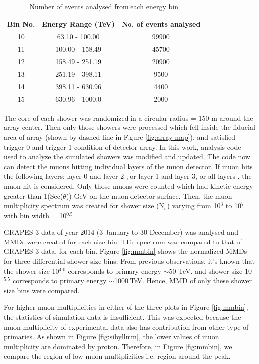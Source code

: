 \documentclass[12pt]{article}
\begin{document}
\begin{table}[h]
\centering
\begin{tabular}{ | c | c | c |} 
\hline
Bin No. & Energy Range (TeV) & No. of events analysed  \\ 
\hline
10 & 63.10 - 100.00 & 99900  \\ 
\hline
11 & 100.00 - 158.49 & 45700  \\
\hline
12 & 158.49 - 251.19 & 20900 \\
\hline
13 & 251.19 - 398.11 & 9500 \\
\hline
14 & 398.11 - 630.96 & 4400 \\
\hline
15 & 630.96 - 1000.0 & 2000 \\
\hline
\end{tabular}
\caption{Number of events analysed from each energy bin}
\label{tab:binning}
\end{table}

The core of each shower was randomized in a circular radius  = 150 m around the array center. Then only those showers were processed which fell inside the fiducial area of array (shown by dashed line in Figure \ref{fig:array-map}), and satisfied trigger-0 and trigger-1 condition of detector array\cite{gupta}. In this work, analysis code used to analyze the simulated showers was modified and updated. The code now can detect the muons hitting individual layers of the muon detector. If muon hits the following layers: layer 0 and layer 2 , or layer 1 and layer 3, or all layers , the muon hit is considered. Only those muons were counted which had kinetic energy greater than 1(Sec($\theta$)) GeV on the muon detector surface. Then, the muon multiplicity spectrum was created for shower size (N$_e$) varying from 10$^3$ to 10$^7$ with bin width = 10$^{0.5}$. 

GRAPES-3 data of year 2014 (3 January to 30 December) was analysed and MMDs were created for each size bin. This spectrum was compared to that of GRAPES-3 data, for each bin. Figure \ref{fig:mmbin} shows the normalized MMDs for three differential shower size bins. From previous observations, it's known that the shower size 10$^{4.0}$ corresponds to  primary energy $\sim$50 TeV. and shower size 10$^{5.5}$ corresponds to primary energy $\sim$1000 TeV. Hence, MMD of only these shower size bins were compared. 

For higher muon multiplicities in either of the three plots in Figure \ref{fig:mmbin}, the statistics of simulation data is insufficient. This was expected because the muon multiplicity of experimental data also has contribution from other type of primaries. As shown in Figure \ref{fig:sibyllmm}, the lower values of muon multiplicity are dominated by proton. Therefore, in Figure \ref{fig:mmbin}, we compare the region of low muon multiplicities i.e. region around the peak. 
\end{document}
